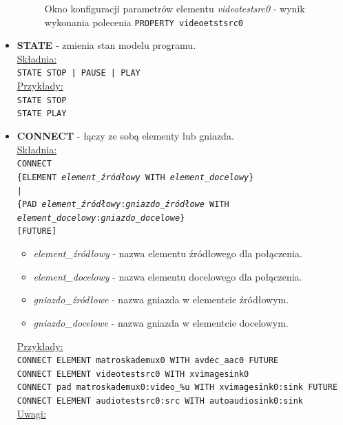\documentclass[12pt]{article}
\begin{document}
\begin{itemize}
\begin{figure}[H]
  \caption{Okno konfiguracji parametrów elementu \textit{videotestsrc0} - wynik wykonania polecenia \texttt{PROPERTY videoetstsrc0}}
  \label{fig:allPropertiesWindow}
\end{figure}
\item \textbf{STATE} - zmienia stan modelu programu. \\
\underline{Składnia:} \\
\texttt{STATE STOP | PAUSE | PLAY} \\
\underline{Przykłady:} \\
\texttt{STATE STOP} \\
\texttt{STATE PLAY}
\item \textbf{CONNECT} - łączy ze sobą elementy lub gniazda. \\
\underline{Składnia:} \\
\texttt{CONNECT \\
\hspace*{2em} \{ELEMENT \textit{element\_źródłowy} WITH \textit{element\_docelowy}\} \\
\hspace*{2em} | \\
\hspace*{2em} \{PAD \textit{element\_źródłowy}:\textit{gniazdo\_źródłowe} WITH \\
\hspace*{4em} \textit{element\_docelowy}:\textit{gniazdo\_docelowe}\} \\
\hspace*{2em} [FUTURE]}
\begin{itemize}
\item \textit{element\_źródłowy} - nazwa elementu źródłowego dla połączenia.
\item \textit{element\_docelowy} - nazwa elementu docelowego dla połączenia.
\item \textit{gniazdo\_źródłowe} - nazwa gniazda w elementcie źródłowym.
\item \textit{gniazdo\_docelowe} - nazwa gniazda w elementcie docelowym.
\end{itemize}
\underline{Przykłady:} \\
\texttt{CONNECT ELEMENT matroskademux0 WITH avdec\_aac0 FUTURE} \\
\texttt{CONNECT ELEMENT videotestsrc0 WITH xvimagesink0} \\
\texttt{CONNECT pad matroskademux0:video\_\%u WITH xvimagesink0:sink FUTURE}
\texttt{CONNECT ELEMENT audiotestsrc0:src WITH autoaudiosink0:sink} \\
\underline{Uwagi:} \\

\end{itemize}
\end{document}
